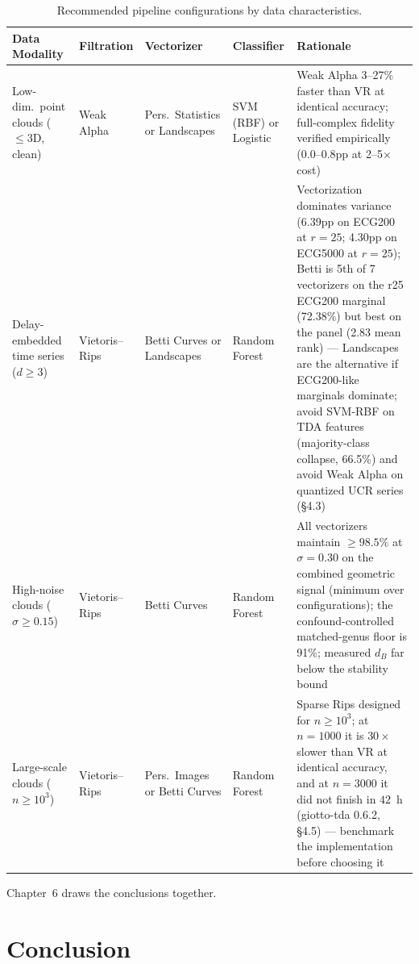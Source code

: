 \documentclass[12pt, a4paper]{report}
\theoremstyle{definition}
\theoremstyle{plain}
\theoremstyle{remark}
\begin{document}
\begin{table}[htbp]
  \centering
  \caption{Recommended pipeline configurations by data characteristics.}
  \label{tab:guidelines}
  \scriptsize
  \setlength{\tabcolsep}{3pt}
  \renewcommand{\arraystretch}{0.9}
    \begin{tabularx}{\textwidth}{XXXXX}
    \toprule
    Data Modality & Filtration & Vectorizer & Classifier & Rationale \\
    \midrule
    Low-dim.~point clouds ($\le 3$D, clean) & Weak Alpha & Pers.~Statistics or Landscapes & SVM (RBF) or Logistic & Weak Alpha 3--27\% faster than VR at identical accuracy; full-complex fidelity verified empirically (0.0--0.8pp at 2--5$\times$ cost) \\
    Delay-embedded time series ($d \ge 3$) & Vietoris--Rips & Betti Curves or Landscapes & Random Forest & Vectorization dominates variance (6.39pp on ECG200 at $r{=}25$; 4.30pp on ECG5000 at $r{=}25$); Betti is 5th of 7 vectorizers on the r25 ECG200 marginal (72.38\%) but best on the panel (2.83 mean rank) --- Landscapes are the alternative if ECG200-like marginals dominate; avoid SVM-RBF on TDA features (majority-class collapse, 66.5\%) and avoid Weak Alpha on quantized UCR series (\S4.3) \\
    High-noise clouds ($\sigma \ge 0.15$) & Vietoris--Rips & Betti Curves & Random Forest & All vectorizers maintain $\ge 98.5\%$ at $\sigma=0.30$ on the combined geometric signal (minimum over configurations); the confound-controlled matched-genus floor is 91\%; measured $d_B$ far below the stability bound \\
    Large-scale clouds ($n \ge 10^3$) & Vietoris--Rips & Pers.\ Images or Betti Curves & Random Forest & Sparse Rips designed for $n \ge 10^3$; at $n{=}1000$ it is $30\times$ slower than VR at identical accuracy, and at $n{=}3000$ it did not finish in $42$~h (giotto-tda 0.6.2, \S4.5) --- benchmark the implementation before choosing it \\
    \bottomrule
  \end{tabularx}
\end{table}

Chapter~6 draws the conclusions together.

\newpage

\chapter{Conclusion}
\label{chap:conclusion}
\end{document}
